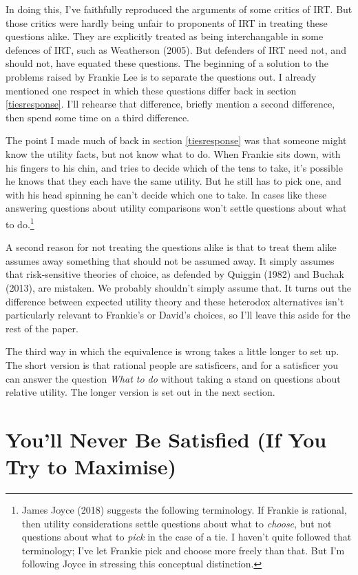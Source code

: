 \documentclass[
  12pt,
]{article}
\begin{document}
In doing this, I've faithfully reproduced the arguments of some critics of IRT. But those critics were hardly being unfair to proponents of IRT in treating these questions alike. They are explicitly treated as being interchangable in some defences of IRT, such as Weatherson (2005). But defenders of IRT need not, and should not, have equated these questions. The beginning of a solution to the problems raised by Frankie Lee is to separate the questions out. I already mentioned one respect in which these questions differ back in section \ref{tiesresponse}. I'll rehearse that difference, briefly mention a second difference, then spend some time on a third difference.

The point I made much of back in section \ref{tiesresponse} was that someone might know the utility facts, but not know what to do. When Frankie sits down, with his fingers to his chin, and tries to decide which of the tens to take, it's possible he knows that they each have the same utility. But he still has to pick one, and with his head spinning he can't decide which one to take. In cases like these answering questions about utility comparisons won't settle questions about what to do.\footnote{James Joyce (2018) suggests the following terminology. If Frankie is rational, then utility considerations settle questions about what to \emph{choose}, but not questions about what to \emph{pick} in the case of a tie. I haven't quite followed that terminology; I've let Frankie pick and choose more freely than that. But I'm following Joyce in stressing this conceptual distinction.}

A second reason for not treating the questions alike is that to treat them alike assumes away something that should not be assumed away. It simply assumes that risk-sensitive theories of choice, as defended by Quiggin (1982) and Buchak (2013), are mistaken. We probably shouldn't simply assume that. It turns out the difference between expected utility theory and these heterodox alternatives isn't particularly relevant to Frankie's or David's choices, so I'll leave this aside for the rest of the paper.

The third way in which the equivalence is wrong takes a little longer to set up. The short version is that rational people are satisficers, and for a satisficer you can answer the question \emph{What to do} without taking a stand on questions about relative utility. The longer version is set out in the next section.

\hypertarget{satisfied}{%
\section{You'll Never Be Satisfied (If You Try to Maximise)}\label{satisfied}}
\end{document}
